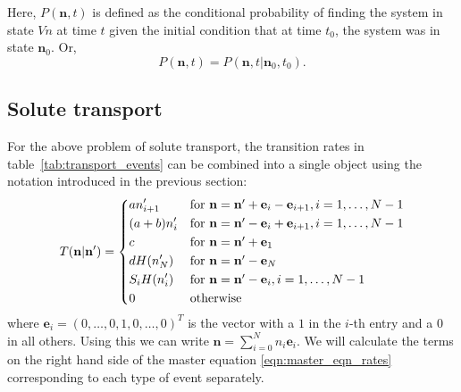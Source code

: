 \documentclass[a4paper,11pt]{article}
\numberwithin{equation}{section}
\newcommand{\V}[1]{\mathbf{#1}}
\begin{document}
Here, \(P(\V{n},t)\) is defined as the conditional probability of finding the
system in state \(V{n}\) at time \(t\) given the initial condition that at time
\(t_0\), the system was in state \(\V{n}_0\). Or,
\begin{equation*}
    P(\V{n},t) = P(\V{n},t | \V{n}_0, t_0).
\end{equation*}

\subsection{Solute transport}
For the above problem of solute transport, the transition rates in
table~\ref{tab:transport_events} can be combined into a single object using the
notation introduced in the previous section:
\begin{equation}
    \label{eqn:}
    T(\V{n}|\V{n}') =%
        \begin{dcases*}
            a n'_{i+1} & for \(\V{n} = \V{n}' + \V{e}_i - \V{e}_{i+1},
            i=1,\dotsc,N-1\)\\
            (a+b) n'_i & for \(\V{n} = \V{n}' - \V{e}_i + \V{e}_{i+1},
            i=1,\dotsc,N-1\)\\
            c & for \(\V{n} = \V{n}' + \V{e}_1\)\\
            d H(n'_N) & for \(\V{n} = \V{n}' - \V{e}_N\)\\
            S_i H(n'_i) & for \(\V{n} = \V{n}' - \V{e}_i, i=1,\dotsc,N-1\)\\
            0 & otherwise
        \end{dcases*}
\end{equation}
where \(\V{e}_i = (0,\dotsc,0,1,0,\dotsc,0)^T\) is the vector with a \(1\) in
the \(i\)-th entry and a \(0\) in all others. Using this we can write \(\V{n} =
\sum_{i=0}^{N} n_i \V{e}_i\). We will calculate the terms on the right hand side
of the master equation \eqref{eqn:master_eqn_rates} corresponding to each type
of event separately.
\end{document}
